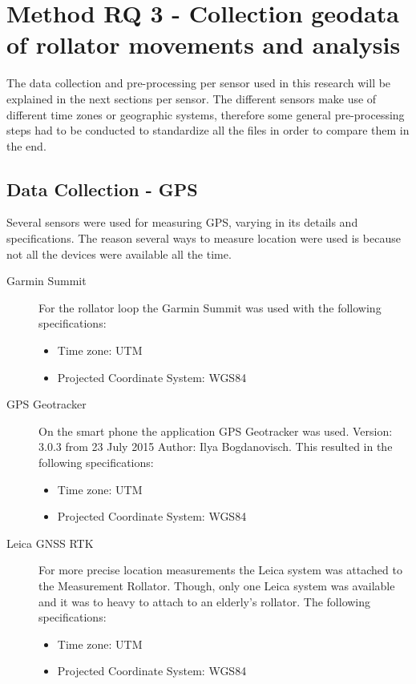 \section{Method RQ 3 - Collection geodata of rollator movements and analysis}\label{rq2b}
The data collection and pre-processing per sensor used in this research will be explained in the next sections per sensor. The different sensors make use of different time zones or geographic systems, therefore some general pre-processing steps had to be conducted to standardize all the files in order to compare them in the end. 

\subsection{Data Collection - GPS }
Several sensors were used for measuring GPS, varying in its details and specifications. The reason several ways to measure location were used is because not all the devices were available all the time. 

\begin{description} 
\item[Garmin Summit]
For the rollator loop the Garmin Summit was used with the following specifications:
\begin{itemize}
\item Time zone: UTM
\item Projected Coordinate System: WGS84
\end{itemize}
\end{description}

\begin{description}
\item[GPS Geotracker ]
On the smart phone the application GPS Geotracker was used. Version: 3.0.3 from 23 July 2015 Author: Ilya Bogdanovisch. This resulted in the following specifications:
\begin{itemize}
\item Time zone: UTM
\item Projected Coordinate System: WGS84
\end{itemize}
\end{description}

\begin{description}
\item[Leica GNSS RTK]
For more precise location measurements the Leica system was attached to the Measurement Rollator. Though, only one Leica system was available and it was to heavy to attach to an elderly's rollator. The following specifications:
\begin{itemize}
\item Time zone: UTM
\item Projected Coordinate System: WGS84
\end{itemize}
\end{description}

